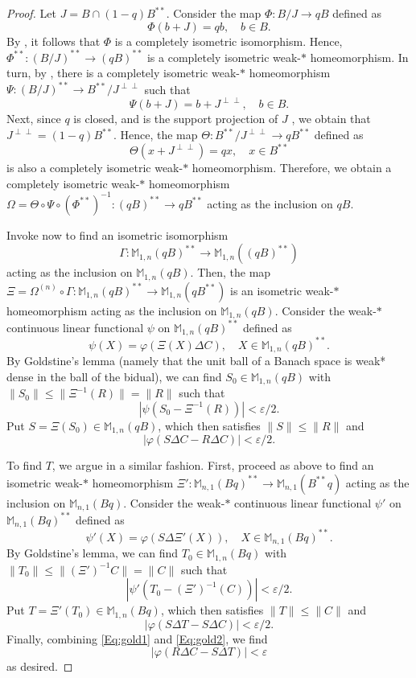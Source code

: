 \documentclass[10pt]{amsart}
\newcommand{\bM}{{\mathbb{M}}}
\newcommand{\eps}{\varepsilon}
\renewcommand{\phi}{\varphi}
\theoremstyle{definition}
\begin{document}
\begin{proof}
Let $J=B\cap (1-q)B^{**}$. Consider the map $\Phi:B/J\to qB$ defined as
\[
\Phi(b+J)=qb, \quad b \in B.
\]
By \cite[Proposition 3.1]{hay2007}, it follows that $\Phi$ is a completely isometric isomorphism. Hence, $\Phi^{**}:(B/J)^{**}\to (qB)^{**}$ is a completely isometric weak-$*$ homeomorphism. In turn, by \cite[Paragraph 1.4.4]{BLM2004}, there is a completely isometric  weak-$*$ homeomorphism $\Psi:(B/J)^{**}\to B^{**}/J^{\perp\perp}$ such that 
\[
\Psi(b+J)=b+J^{\perp\perp},\quad b\in B.
\]
Next, since $q$ is closed, 
and is the support projection of $J$ %
 \cite{akemann1969},
we obtain that $J^{\perp\perp}=(1-q)B^{**}$. Hence, the map $\Theta: B^{**}/J^{\perp\perp}\to qB^{**}$ defined as
\[
\Theta(x+J^{\perp\perp})=qx, \quad x\in B^{**}
\]
is also a completely isometric weak-$*$ homeomorphism. Therefore, we obtain a completely isometric weak-$*$ homeomorphism $\Omega=\Theta\circ \Psi \circ (\Phi^{**})^{-1} :(qB)^{**}\to qB^{**}$ acting as the inclusion on $qB$.

Invoke now \cite[Theorem 1.4.11]{BLM2004} to find an isometric isomorphism $$\Gamma:\bM_{1,n}(qB)^{**}\to \bM_{1,n}((qB)^{**})$$ acting as the inclusion on $\bM_{1,n}(qB)$. Then, the map $\Xi=\Omega^{(n)}\circ \Gamma: \bM_{1,n}(qB)^{**}\to \bM_{1,n}(qB^{**})$ is an   isometric weak-$*$ homeomorphism acting as the inclusion on  $\bM_{1,n}(qB)$.
Consider the weak-$*$ continuous linear functional $\psi$ on $\bM_{1,n}(qB)^{**}$ defined as
\[
\psi(X)= \phi(\Xi(X)\Delta C), \quad X\in \bM_{1,n}(qB)^{**}.
\]
By Goldstine's lemma
(namely that the unit ball of a Banach space is weak* dense in the ball of the bidual), we can find $S_0\in \bM_{1,n}(qB)$ with $\|S_0\|\leq \|\Xi^{-1}(R)\|= \|R\|$ such that
$$
|\psi(S_0-\Xi^{-1}(R))|<\eps/2.
$$
Put $S=\Xi(S_0)\in \bM_{1,n}(qB)$, which then satisfies $\|S\|\leq \|R\|$ and
\begin{equation}\label{Eq:gold1}
|\phi( S\Delta C-R\Delta C)|<\eps/2.
\end{equation}

To find $T$, we argue in a similar fashion. First, proceed as above to find  an isometric weak-$*$ homeomorphism $\Xi': \bM_{n,1}(Bq)^{**}\to \bM_{n,1}(B^{**}q)$ acting as the inclusion on  $\bM_{n,1}(Bq)$.  Consider  the weak-$*$ continuous linear functional $\psi'$ on $\bM_{n,1}(Bq)^{**}$ defined as
\[
\psi'(X)= \phi(S\Delta \Xi'(X)), \quad X\in \bM_{n,1}(Bq)^{**}.
\]
By Goldstine's lemma, we can find $T_0\in \bM_{1,n}(Bq)$ with $\|T_0\|\leq \|(\Xi')^{-1}C\|=\|C\|$ such that
\[
|\psi' (T_0- (\Xi')^{-1}(C))|<\eps/2.
\]
Put $T=\Xi'(T_0)\in \bM_{1,n}(Bq)$, which then satisfies $\|T\|\leq \|C\|$ and
\begin{equation}\label{Eq:gold2}
|\phi( S\Delta T-S\Delta C)|<\eps/2.
\end{equation}
Finally, combining \eqref{Eq:gold1} and \eqref{Eq:gold2}, we find
\[
| \phi(R\Delta C-S\Delta T)|<\eps
\]
as desired.
\end{proof}
\end{document}

